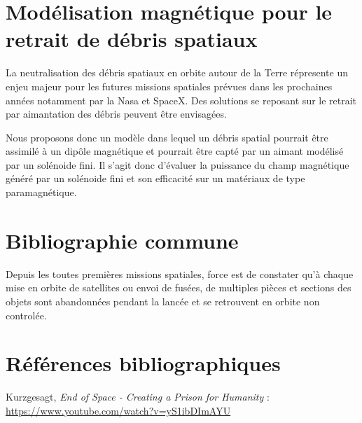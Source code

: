 \documentclass[a4paper,1pt]{article}
\begin{document}
\section{Modélisation magnétique pour le retrait de débris spatiaux}

La neutralisation des débris spatiaux en orbite autour de la Terre répresente un enjeu majeur pour les futures missions spatiales prévues dans les prochaines années notamment par la Nasa et SpaceX. Des solutions se reposant sur le retrait par aimantation des débris peuvent être envisagées.

Nous proposons donc un modèle dans lequel un débris spatial pourrait être assimilé à un dipôle magnétique et pourrait être capté par un aimant modélisé par un solénoide fini. Il s'agit donc d'évaluer la puissance du champ magnétique généré par un solénoide fini et son efficacité sur un matériaux de type paramagnétique. 
\section{Bibliographie commune}
Depuis les toutes premières missions spatiales, force est de constater qu'à chaque mise en orbite de satellites ou envoi de fusées, de multiples pièces et sections des objets sont abandonnées pendant la lancée et se retrouvent en orbite non controlée. 
\section{Références bibliographiques}
\begin{thebibliography}{11}
	Kurzgesagt, \textit{End of Space - Creating a Prison for Humanity} :
	\url{https://www.youtube.com/watch?v=yS1ibDImAYU}
\end{thebibliography}
\end{document}
